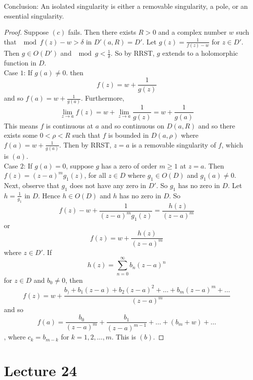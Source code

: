 \documentclass[12pt]{article}
\begin{document}
Conclusion: An isolated singularity is either a removable singularity, a pole, or an essential singularity. 
\begin{proof} Suppose $(c)$ fails. Then there exists $R > 0$ and a complex number $w$ such that $\mod{f(z) -w} > \delta$ in $D'(a,R) = D'$. Let $g(z) = \frac{1}{f(z) - w}$ for $z \in D'$. Then $g \in O(D')$ and $\mod{g} < \frac{1}{\delta}$. So by RRST, $g$ extends to a holomorphic function in $D$. \\
Case $1$: If $g(a) \neq 0$. then $$f(z) = w + \frac{1}{g(z)} $$ and so $f(a) = w + \frac{1}{g(a)}$. Furthermore, $$ \lim_{z\to a} f(z) = w + \lim_{z\to a} \frac{1}{g(z)} = w + \frac{1}{g(a)} $$ This means $f$ is continuous at $a$ and so continuous on $D(a,R)$ and so there exists some $0 < \rho < R$ such that $f$ is bounded in $D(a,\rho)$ where $f(a) = w + \frac{1}{g(a)}$. Then by RRST, $z=a$ is a removable singularity of $f$, which is $(a)$. \\
Case $2$: If $g(a) = 0$, suppose $g$ has a zero of order $m \geq 1$ at $z = a$. Then $f(z) = (z-a)^mg_1(z)$, for all $z \in D$ where $g_1 \in O(D)$ and $g_1(a) \neq 0$. Next, observe that $g_1$ does not have any zero in $D'$. So $g_1$ has no zero in $D$. Let $h = \frac{1}{g_1}$ in $D$. Hence $h \in O(D)$ and $h$ has no zero in $D$. So $$ f(z) - w + \frac{1}{(z-a)^mg_1(z)} = \frac{h(z)}{(z-a)^m} $$ or $$ f(z) = w + \frac{h(z)}{(z-a)^m} $$where $z \in D'$. If $$h(z) = \sum_{n=0}^\infty b_n(z-a)^n$$ for $z \in D$ and $b_0 \neq 0$, then $$f(z) = w + \frac{b_) + b_1(z-a) + b_2(z-a)^2 + \dots + b_m(z-a)^m + \dots}{(z-a)^m} $$ and so $$ f(a) = \frac{b_0}{(z-a)^m} + \frac{b_1}{(z-a)^{m-1}} + \dots + (b_m + w) + \dots $$, where $c_k = b_{m-k}$ for $k=1,2,\dots,m$. This is $(b)$. \end{proof} 

\section{Lecture 24} 
\end{document}

